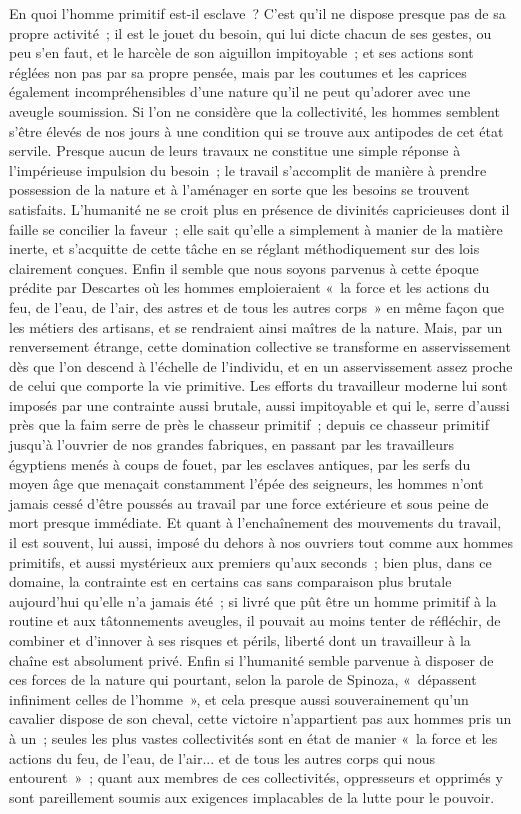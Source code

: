 \documentclass[french,twoside]{book} %
\begin{document}
En quoi l'homme primitif est-il esclave ? C'est qu'il ne dispose presque pas de sa propre activité ; il est le jouet du besoin, qui lui dicte chacun de ses gestes, ou peu s'en faut, et le harcèle de son aiguillon impitoyable ; et ses actions sont réglées non pas par sa propre pensée, mais par les coutumes et les caprices également incompréhensibles d'une nature qu'il ne peut qu'adorer avec une aveugle soumission. Si l'on ne considère que la collectivité, les hommes semblent s'être élevés de nos jours à une condition qui se trouve aux antipodes de cet état servile. Presque aucun de leurs travaux ne constitue une simple réponse à l'impérieuse impulsion du besoin ; le travail s'accomplit de manière à prendre possession de la nature et à l'aménager en sorte que les besoins se trouvent satisfaits. L'humanité ne se croit plus en présence de divinités capricieuses dont il faille se concilier la faveur ; elle sait qu'elle a simplement à manier de la matière inerte, et s'acquitte de cette tâche en se réglant méthodiquement sur des lois clairement conçues. Enfin il semble que nous soyons parvenus à cette époque prédite par Descartes où les hommes emploieraient « la force et les actions du feu, de l'eau, de l'air, des astres et de tous les autres corps » en même façon que les métiers des artisans, et se rendraient ainsi maîtres de la nature. Mais, par un renversement étrange, cette domination collective se transforme en asservissement dès que l'on descend à l'échelle de l'individu, et en un asservissement assez proche de celui que comporte la vie primitive. Les efforts du travailleur moderne lui sont imposés par une contrainte aussi brutale, aussi impitoyable et qui le, serre d'aussi près que la faim serre de près le chasseur primitif ; depuis ce chasseur primitif jusqu'à l'ouvrier de nos grandes fabriques, en passant par les travailleurs égyptiens menés à coups de fouet, par les esclaves antiques, par les serfs du moyen âge que menaçait constamment l'épée des seigneurs, les hommes n'ont jamais cessé d'être poussés au travail par une force extérieure et sous peine de mort presque immédiate. Et quant à l'enchaînement des mouvements du travail, il est souvent, lui aussi, imposé du dehors à nos ouvriers tout comme aux hommes primitifs, et aussi mystérieux aux premiers qu'aux seconds ; bien plus, dans ce domaine, la contrainte est en certains cas sans comparaison plus brutale aujourd'hui qu'elle n'a jamais été ; si livré que pût être un homme primitif à la routine et aux tâtonnements aveugles, il pouvait au moins tenter de réfléchir, de combiner et d'innover à ses risques et périls, liberté dont un travailleur à la chaîne est absolument privé. Enfin si l'humanité semble parvenue à disposer de ces forces de la nature qui pourtant, selon la parole de Spinoza, « dépassent infiniment celles de l'homme », et cela presque aussi souverainement qu'un cavalier dispose de son cheval, cette victoire n'appartient pas aux hommes pris un à un ; seules les plus vastes collectivités sont en état de manier « la force et les actions du feu, de l'eau, de l'air... et de tous les autres corps qui nous entourent » ; quant aux membres de ces collectivités, oppresseurs et opprimés y sont pareillement soumis aux exigences implacables de la lutte pour le pouvoir.\par
\end{document}
